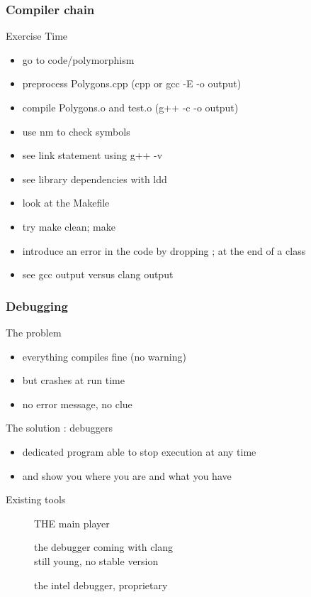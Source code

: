 \begin{frame}[fragile]
  \frametitle{Compiler chain}
  \begin{alertblock}{Exercise Time}
    \begin{itemize}
    \item go to code/polymorphism
    \item preprocess Polygons.cpp (cpp or gcc -E -o output)
    \item compile Polygons.o and test.o (g++ -c -o output)
    \item use nm to check symbols
    \item see link statement using g++ -v
    \item see library dependencies with ldd
    \item look at the Makefile
    \item try make clean; make
    \item introduce an error in the code by dropping ; at the end of a class
    \item see gcc output versus clang output
    \end{itemize}
  \end{alertblock}
\end{frame}


\begin{frame}[fragile]
  \frametitle{Debugging}
  \begin{alertblock}{The problem}
    \begin{itemize}
      \item everything compiles fine (no warning)
      \item but crashes at run time
      \item no error message, no clue
    \end{itemize}
  \end{alertblock}
  \pause
  \begin{block}{The solution : debuggers}
    \begin{itemize}
    \item dedicated program able to stop execution at any time
    \item and show you where you are and what you have
    \end{itemize}
  \end{block}
  \pause
  \begin{block}{Existing tools}
    \begin{description}
    \item[\href{http://www.sourceware.org/gdb/}{}]
      THE main player
    \item[\href{http://lldb.llvm.org/}{}]
      the debugger coming with clang \\
      still young, no stable version
    \item[\href{http://software.intel.com/en-us/articles/idb-linux}{}]
      the intel debugger, proprietary
    \end{description}
  \end{block}
\end{frame}

